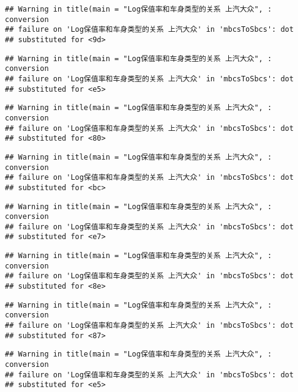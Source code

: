 \documentclass[]{article}
\begin{document}
\begin{verbatim}
## Warning in title(main = "Log保值率和车身类型的关系 上汽大众", : conversion
## failure on 'Log保值率和车身类型的关系 上汽大众' in 'mbcsToSbcs': dot
## substituted for <9d>
\end{verbatim}

\begin{verbatim}
## Warning in title(main = "Log保值率和车身类型的关系 上汽大众", : conversion
## failure on 'Log保值率和车身类型的关系 上汽大众' in 'mbcsToSbcs': dot
## substituted for <e5>
\end{verbatim}

\begin{verbatim}
## Warning in title(main = "Log保值率和车身类型的关系 上汽大众", : conversion
## failure on 'Log保值率和车身类型的关系 上汽大众' in 'mbcsToSbcs': dot
## substituted for <80>
\end{verbatim}

\begin{verbatim}
## Warning in title(main = "Log保值率和车身类型的关系 上汽大众", : conversion
## failure on 'Log保值率和车身类型的关系 上汽大众' in 'mbcsToSbcs': dot
## substituted for <bc>
\end{verbatim}

\begin{verbatim}
## Warning in title(main = "Log保值率和车身类型的关系 上汽大众", : conversion
## failure on 'Log保值率和车身类型的关系 上汽大众' in 'mbcsToSbcs': dot
## substituted for <e7>
\end{verbatim}

\begin{verbatim}
## Warning in title(main = "Log保值率和车身类型的关系 上汽大众", : conversion
## failure on 'Log保值率和车身类型的关系 上汽大众' in 'mbcsToSbcs': dot
## substituted for <8e>
\end{verbatim}

\begin{verbatim}
## Warning in title(main = "Log保值率和车身类型的关系 上汽大众", : conversion
## failure on 'Log保值率和车身类型的关系 上汽大众' in 'mbcsToSbcs': dot
## substituted for <87>
\end{verbatim}

\begin{verbatim}
## Warning in title(main = "Log保值率和车身类型的关系 上汽大众", : conversion
## failure on 'Log保值率和车身类型的关系 上汽大众' in 'mbcsToSbcs': dot
## substituted for <e5>
\end{verbatim}
\end{document}
